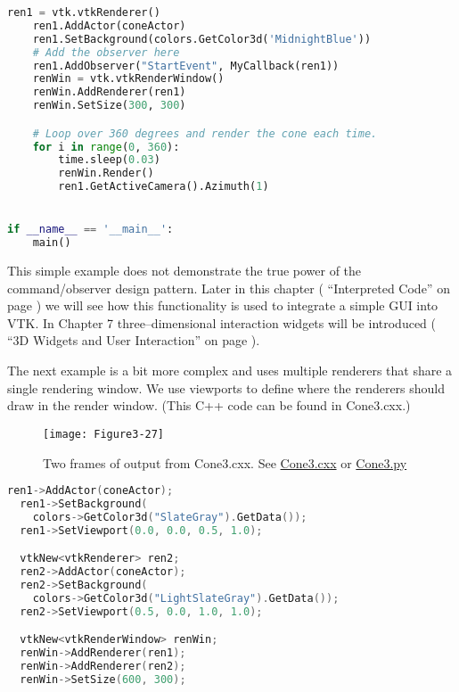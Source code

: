 \begin{description}[leftmargin=0cm,labelindent=0cm]
\begin{lstlisting}[language=Python, caption={Cone2.py}, escapechar=\$]
    ren1 = vtk.vtkRenderer()
    ren1.AddActor(coneActor)
    ren1.SetBackground(colors.GetColor3d('MidnightBlue'))
    # Add the observer here
    ren1.AddObserver("StartEvent", MyCallback(ren1))
    renWin = vtk.vtkRenderWindow()
    renWin.AddRenderer(ren1)
    renWin.SetSize(300, 300)

    # Loop over 360 degrees and render the cone each time.
    for i in range(0, 360):
        time.sleep(0.03)
        renWin.Render()
        ren1.GetActiveCamera().Azimuth(1)


if __name__ == '__main__':
    main()
\end{lstlisting}

This simple example does not demonstrate the true power of the command/observer design pattern. Later in this chapter ( ``Interpreted Code'' on page \pageref{subsec:examples_interpreted_code} ) we will see how this functionality is used to integrate a simple GUI into VTK. In Chapter 7 three--dimensional interaction widgets will be introduced ( ``3D Widgets and User Interaction''  on page \pageref{sec:3D_widgets_user_interaction} ).

\item[Creating Multiple Renderers.]

The next example is a bit more complex and uses multiple renderers that share a single rendering window. We use viewports to define where the renderers should draw in the render window. (This C++ code can be found in Cone3.cxx.)

\begin{figure}[!htb]
  \centering
  \texttt{[image: Figure3-27]}\\
  \caption{Two frames of output from Cone3.cxx. See  \href{https://lorensen.github.io/VTKExamples/site/Cxx/Rendering/Cone3/}{Cone3.cxx} or \href{https://lorensen.github.io/VTKExamples/site/Python/Rendering/Cone3/}{Cone3.py}}\label{fig:Figure3-27}
\end{figure}

\begin{lstlisting}[language=C++, caption={Cone3.cxx}]
  ren1->AddActor(coneActor);
  ren1->SetBackground(
    colors->GetColor3d("SlateGray").GetData());
  ren1->SetViewport(0.0, 0.0, 0.5, 1.0);

  vtkNew<vtkRenderer> ren2;
  ren2->AddActor(coneActor);
  ren2->SetBackground(
    colors->GetColor3d("LightSlateGray").GetData());
  ren2->SetViewport(0.5, 0.0, 1.0, 1.0);

  vtkNew<vtkRenderWindow> renWin;
  renWin->AddRenderer(ren1);
  renWin->AddRenderer(ren2);
  renWin->SetSize(600, 300);


\end{lstlisting}
\end{description}
